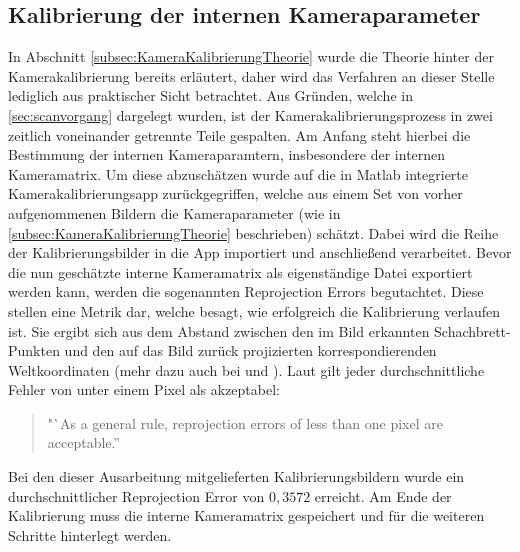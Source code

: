 \subsection{Kalibrierung der internen Kameraparameter}
\label{subsec:interneKalibrierung}
In Abschnitt \ref{subsec:KameraKalibrierungTheorie} wurde die Theorie hinter der Kamerakalibrierung bereits erläutert, daher wird das Verfahren an dieser Stelle lediglich aus praktischer Sicht betrachtet. Aus Gründen, welche in \ref{sec:scanvorgang} dargelegt wurden, ist der Kamerakalibrierungsprozess in zwei zeitlich voneinander getrennte Teile gespalten. Am Anfang steht hierbei die Bestimmung der internen Kameraparamtern, insbesondere der internen Kameramatrix. Um diese abzuschätzen wurde auf die in Matlab integrierte Kamerakalibrierungsapp zurückgegriffen, welche aus einem Set von vorher aufgenommenen Bildern die Kameraparameter (wie in \ref{subsec:KameraKalibrierungTheorie} beschrieben) schätzt. Dabei wird die Reihe der Kalibrierungsbilder in die App importiert und anschließend verarbeitet. Bevor die nun geschätzte interne Kameramatrix als eigenständige Datei exportiert werden kann, werden die sogenannten Reprojection Errors begutachtet. Diese stellen eine Metrik dar, welche besagt, wie erfolgreich die Kalibrierung verlaufen ist. Sie ergibt sich aus dem Abstand zwischen den im Bild erkannten Schachbrett-Punkten und den auf das Bild zurück projizierten korrespondierenden Weltkoordinaten (mehr dazu auch bei \cite{Mathworks:17a} und \cite{StackOverflow:15}). Laut \cite{Mathworks:17} gilt jeder durchschnittliche Fehler von unter einem Pixel als akzeptabel:
\begin{quotation}
"`As a general rule, reprojection errors of less than one pixel are acceptable.''
\end{quotation}
Bei den dieser Ausarbeitung mitgelieferten Kalibrierungsbildern wurde ein durchschnittlicher Reprojection Error von  \(0,3572\) erreicht. Am Ende der Kalibrierung muss die interne Kameramatrix gespeichert und für die weiteren Schritte hinterlegt werden.  

